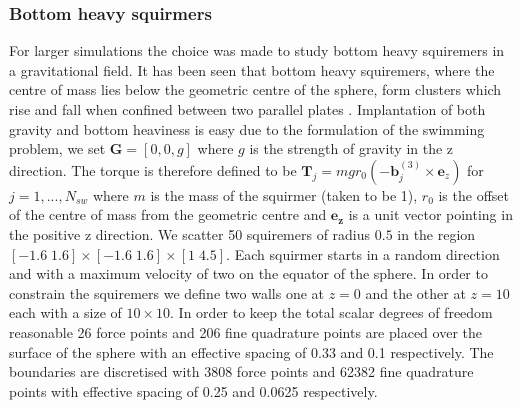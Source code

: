 \subsubsection{Bottom heavy squirmers}
For larger simulations the choice was made to study bottom heavy squiremers in a gravitational field. It has been seen that bottom heavy squiremers, where the centre of mass lies below the geometric centre of the sphere, form clusters which rise and fall when confined between two parallel plates \cite{Ruhle2020EmergentGravity}. Implantation of both gravity and bottom heaviness is easy due to the formulation of the swimming problem, we set $\bm{G}=[0,0,g]$ where $g$ is the strength of gravity in the z direction. The torque is therefore defined to be $\bm{T}_j =  m g r_0 ( -\bm{b}_j^{(3)} \times \bm{e}_z)$ for $j=1,...,N_{sw}$ where $m$ is the mass of the squirmer (taken to be 1), $r_0$ is the offset of the centre of mass from the geometric centre and $\bm{e_z}$ is a unit vector pointing in the positive z direction. We scatter 50 squiremers of radius $0.5$ in the region $[-1.6\; 1.6] \times [-1.6\; 1.6] \times [1\; 4.5]$. Each squirmer starts in a random direction and with a maximum velocity of two on the equator of the sphere. In order to constrain the squiremers we define two walls one at $z=0$ and the other at $z=10$ each with a size of $10 \times 10$. In order to keep the total scalar degrees of freedom reasonable 26 force points and 206 fine quadrature points are placed over the surface of the sphere with an effective spacing of 0.33 and 0.1 respectively. The boundaries are discretised with 3808 force points and 62382 fine quadrature points with effective spacing of 0.25 and 0.0625 respectively. 


